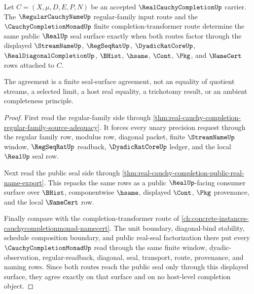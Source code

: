 \begin{theorem}
\label{thm:real-cauchy-completion-regular-name-route-agreement}
Let $C=(X,\mu,D,E,P,N)$ be an accepted $\RealCauchyCompletionUp$ carrier. The $\RegularCauchyNameUp$ regular-family input route and the $\CauchyCompletionMonadUp$ finite completion-transformer route determine the same public $\RealUp$ seal surface exactly when both routes factor through the displayed $\StreamNameUp$, $\RegSeqRatUp$, $\DyadicRatCoreUp$, $\RealDiagonalCompletionUp$, $\BHist$, $\hsame$, $\Cont$, $\Pkg$, and $\NameCert$ rows attached to $C$.

The agreement is a finite seal-surface agreement, not an equality of quotient streams, a selected limit, a host real equality, a trichotomy result, or an ambient completeness principle.
\end{theorem}
\begin{proof}
First read the regular-family side through \autoref{thm:real-cauchy-completion-regular-family-source-adequacy}. It forces every unary precision request through the regular family row, modulus row, diagonal packet, finite $\StreamNameUp$ window, $\RegSeqRatUp$ readback, $\DyadicRatCoreUp$ ledger, and the local $\RealUp$ seal row.

Next read the public seal side through \autoref{thm:real-cauchy-completion-public-real-name-export}. This repacks the same rows as a public $\RealUp$-facing consumer surface over $\BHist$, componentwise $\hsame$, displayed $\Cont$, $\Pkg$ provenance, and the local $\NameCert$ row.

Finally compare with the completion-transformer route of \autoref{ch:concrete-instances-cauchycompletionmonad-namecert}. The unit boundary, diagonal-bind stability, schedule composition boundary, and public real-seal factorization there put every $\CauchyCompletionMonadUp$ read through the same finite window, dyadic-observation, regular-readback, diagonal, seal, transport, route, provenance, and naming rows. Since both routes reach the public seal only through this displayed surface, they agree exactly on that surface and on no host-level completion object.
\end{proof}

